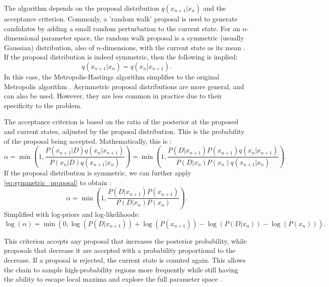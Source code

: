 \documentclass[preprint,longauthor]{aastex631}
\numberwithin{equation}{section}
\begin{document}
The algorithm depends on the proposal distribution $q(x_{n+1}|x_n)$ and the acceptance criterion. Commonly, a 'random walk' proposal is used to generate candidates by adding a small random perturbation to the current state. For an $n$-dimensional parameter space, the random walk proposal is a symmetric (usually Gaussian) distribution, also of $n$-dimensions, with the current state as its mean \citep{vontoussaintBayesianInferencePhysics2011}. If the proposal distribution is indeed symmetric, then the following is implied:
\begin{equation}
  \label{eq:symmetric_proposal}
  q(x_{n+1}|x_n) = q(x_n|x_{n+1}).
\end{equation}
In this case, the Metropolis-Hastings algorithm simplifies to the original Metropolis algorithm \citep{brewer1BayesianInference2018}. Asymmetric proposal distributions are more general, and can also be used. However, they are less common in practice due to their specificity to the problem.

The acceptance criterion is based on the ratio of the posterior at the proposed and current states, adjusted by the proposal distribution. This is the probability of the proposal being accepted. Mathematically, this is \citep{brewer1BayesianInference2018}:
\begin{equation}
  \alpha = \min\left(1, \frac{P(x_{n+1}|D) q(x_n|x_{n+1})}{P(x_n|D) q(x_{n+1}|x_n)}\right) = \min\left(1, \frac{P(D|x_{n+1}) P(x_{n+1}) q(x_n|x_{n+1})}{P(D|x_n) P(x_n) q(x_{n+1}|x_n)}\right).
\end{equation}
If the proposal distribution is symmetric, we can further apply \autoref{eq:symmetric_proposal} to obtain \citep{brewer1BayesianInference2018}:
\begin{equation}
  \alpha = \min\left(1, \frac{P(D|x_{n+1}) P(x_{n+1})}{P(D|x_n) P(x_n)}\right).
\end{equation}
Simplified with log-priors and log-likelihoods:
\begin{equation}
  \log(\alpha) = \min\left(0, \log(P(D|x_{n+1})) + \log(P(x_{n+1})) - \log(P(D|x_n)) - \log(P(x_n))\right).
\end{equation}

This criterion accepts any proposal that increases the posterior probability, while proposals that decrease it are accepted with a probability proportional to the decrease. If a proposal is rejected, the current state is counted again. This allows the chain to sample high-probability regions more frequently while still having the ability to escape local maxima and explore the full parameter space \citep{brewer1BayesianInference2018}.
\end{document}
